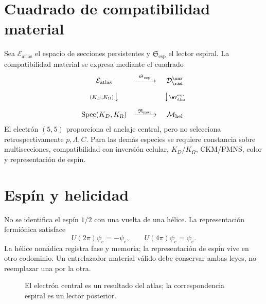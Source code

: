 \section{Cuadrado de compatibilidad material}

Sea \(\mathcal E_{\mathrm{atlas}}\) el espacio de secciones persistentes y
\(\mathfrak S_{\mathrm{esp}}\) el lector espiral. La compatibilidad material
se expresa mediante el cuadrado
\[
\begin{array}{ccc}
\mathcal E_{\mathrm{atlas}}
 & \xrightarrow{\ \mathfrak S_{\mathrm{esp}}\ }
 & \mathcal D_{\rad}^{\enr}\\[1.0em]
{\scriptstyle (K_D,K_\Omega)}\big\downarrow
 && \big\downarrow{\scriptstyle \ev_{\mathrm{dim}}^{\mathrm{esp}}}\\[1.0em]
\operatorname{Spec}(K_D,K_\Omega)
 & \xrightarrow{\ \mathfrak R_{\mathrm{mat}}\ }
 & \mathcal M_{\mathrm{hel}}
\end{array}
\]
El electrón \((5,5)\) proporciona el anclaje central, pero no selecciona
retrospectivamente \(p,\Lambda,C\). Para las demás especies se requiere
constancia sobre multisecciones, compatibilidad con inversión celular,
\(K_D/K_\Omega\), CKM/PMNS, color y representación de espín.

\section{Espín y helicidad}

No se identifica el espín \(1/2\) con una vuelta de una hélice. La
representación fermiónica satisface
\[
 U(2\pi)\psi_e=-\psi_e,
 \qquad
 U(4\pi)\psi_e=\psi_e.
\]
La hélice nonádica registra fase y memoria; la representación de espín vive
en otro codominio. Un entrelazador material válido debe conservar ambas
leyes, no reemplazar una por la otra.

\begin{figure}[htbp]
\centering
{}
\caption{El electrón central es un resultado del atlas; la correspondencia espiral es un lector posterior.}
\label{espiral:fig:atlas-electron}
\end{figure}
